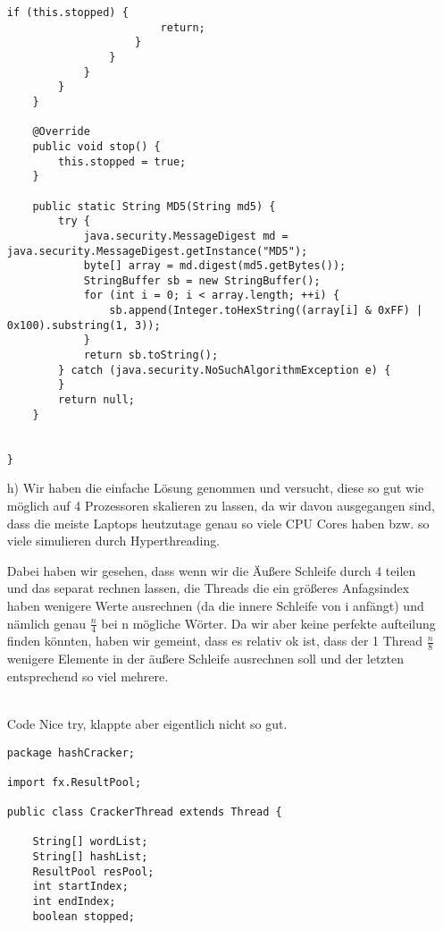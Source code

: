 \begin{enumerate}
\begin{lstlisting}[style=java]
                    if (this.stopped) {
                        return;
                    }
                }
            }
        }
    }

    @Override
    public void stop() {
        this.stopped = true;
    }

    public static String MD5(String md5) {
        try {
            java.security.MessageDigest md = java.security.MessageDigest.getInstance("MD5");
            byte[] array = md.digest(md5.getBytes());
            StringBuffer sb = new StringBuffer();
            for (int i = 0; i < array.length; ++i) {
                sb.append(Integer.toHexString((array[i] & 0xFF) | 0x100).substring(1, 3));
            }
            return sb.toString();
        } catch (java.security.NoSuchAlgorithmException e) {
        }
        return null;
    }


}

\end{lstlisting}

\item[h)]
Wir haben die einfache Lösung genommen und versucht, diese so gut wie möglich auf 4 Prozessoren skalieren zu lassen, da wir davon ausgegangen sind, dass die meiste Laptops heutzutage genau so viele CPU Cores haben bzw. so viele simulieren durch Hyperthreading.

Dabei haben wir gesehen, dass wenn wir die Äußere Schleife durch 4 teilen und das separat rechnen lassen, die Threads die ein größeres Anfagsindex haben wenigere Werte ausrechnen (da die innere Schleife von i anfängt) und nämlich genau $\frac{n}{4}$ bei n mögliche Wörter. Da wir aber keine perfekte aufteilung finden könnten, haben wir gemeint, dass es relativ ok ist, dass der 1 Thread $\frac{n}{8}$ wenigere Elemente in der äußere Schleife ausrechnen soll und der letzten entsprechend so viel mehrere. \\ \\

\item[Code]
Nice try, klappte aber eigentlich nicht so gut.

\begin{lstlisting}[style=java]
package hashCracker;

import fx.ResultPool;

public class CrackerThread extends Thread {

    String[] wordList;
    String[] hashList;
    ResultPool resPool;
    int startIndex;
    int endIndex;
    boolean stopped;


\end{lstlisting}
\end{enumerate}
